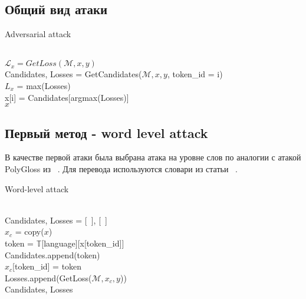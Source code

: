 \newcommand{\ind}{\hspace{\algorithmicindent}}

\subsection{Общий вид атаки}

\begin{algorithm}
    \caption{Adversarial attack}
    \begin{algorithmic}
         \\
        $\mathcal{L}_{x} = GetLoss(\mathcal{M}, x, y)$
            \\
            \ind Candidates, Losses = GetCandidates($\mathcal{M}, x, y$, token\_id = i)
            \ind{}
                    \\
                    \ind\ind$L_{x}$ = max(Losses) \\
                    \ind\ind x[i] = Candidates[argmax(Losses)]
            \EndIf
        \EndFor \\
        \Return $x$
    \end{algorithmic}\label{alg:algorithm}
\end{algorithm}

\subsection{Первый метод - word level attack}
В качестве первой атаки была выбрана атака на уровне слов
по аналогии с атакой PolyGloss из ~\cite{Tan2021CodeMixingOS}.
Для перевода используются словари из статьи ~\cite{Choe2020word2wordAC}.

\begin{algorithm}
    \caption{Word-level attack}
    \begin{algorithmic}
            \\
            \ind Candidates, Losses = [~], [~]\\
            \ind$x_c$ = copy($x$)
                \ind{}
                        \\
                        \ind\ind\ind token = $\mathbb{T}$[language][x[token\_id]]\\
                        \ind\ind\ind Candidates.append(token)\\
                        \ind\ind\ind $x_c$[token\_id] = token\\
                        \ind\ind\ind Losses.append(GetLoss($\mathcal{M}, x_c, y$))
                \EndIf
            \EndFor \\
            \Return Candidates, Losses
        \EndFunction
    \end{algorithmic}\label{alg:algorithm1}
\end{algorithm}

